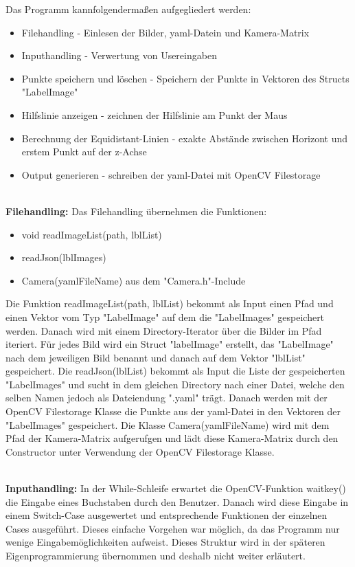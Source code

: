 \documentclass[11pt]{scrartcl}
\begin{document}
\noindent
Das Programm kannfolgendermaßen aufgegliedert werden:
\begin{itemize}
	\item Filehandling - Einlesen der Bilder, yaml-Datein und Kamera-Matrix
	\item Inputhandling - Verwertung von Usereingaben
	\item Punkte speichern und löschen - Speichern der Punkte in Vektoren des Structs "LabelImage"
	\item Hilfslinie anzeigen - zeichnen der Hilfslinie am Punkt der Maus
	\item Berechnung der Equidistant-Linien - exakte Abstände zwischen Horizont und erstem Punkt auf der z-Achse
	\item Output generieren - schreiben der yaml-Datei mit OpenCV Filestorage
\end{itemize}

\noindent
\\
\textbf{Filehandling:}
\noindent
Das Filehandling übernehmen die Funktionen:
\begin{itemize}
	\item void readImageList(path,  lblList)
	\item readJson(lblImages)
	\item Camera(yamlFileName) aus dem "Camera.h"-Include
\end{itemize}

\noindent
Die Funktion readImageList(path,  lblList) bekommt als Input einen Pfad und einen Vektor vom Typ "LabelImage" auf dem die "LabelImages" gespeichert werden. Danach wird mit einem Directory-Iterator über die Bilder im Pfad iteriert. Für jedes Bild wird ein Struct "labelImage" erstellt, das "LabelImage" nach dem jeweiligen Bild benannt und danach auf dem Vektor "lblList" gespeichert. Die readJson(lblList) bekommt als Input die Liste der gespeicherten "LabelImages" und sucht in dem gleichen Directory nach einer Datei, welche den selben Namen jedoch als Dateiendung ".yaml" trägt. Danach werden mit der OpenCV Filestorage Klasse die Punkte aus der yaml-Datei in den Vektoren der "LabelImages" gespeichert. Die Klasse Camera(yamlFileName) wird mit dem Pfad der Kamera-Matrix aufgerufgen und lädt diese Kamera-Matrix durch den Constructor unter Verwendung der OpenCV Filestorage Klasse.


\noindent
\\
\textbf{Inputhandling:}
\noindent
In der While-Schleife erwartet die OpenCV-Funktion waitkey() die Eingabe eines Buchstaben durch den Benutzer. Danach wird diese Eingabe in einem Switch-Case ausgewertet und entsprechende Funktionen der einzelnen Cases ausgeführt. Dieses einfache Vorgehen war möglich, da das Programm nur wenige Eingabemöglichkeiten aufweist. Dieses Struktur wird in der späteren Eigenprogrammierung übernommen und deshalb nicht weiter erläutert.
\end{document}
